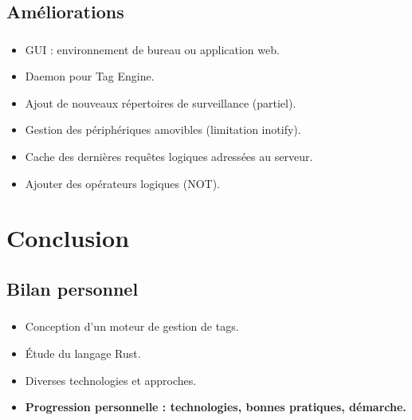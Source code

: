 \documentclass[10pt]{beamer}
\begin{document}
\subsection{Améliorations}
\begin{frame}
    \frametitle{\subsecname}
    \begin{itemize}
        \pause
        \item GUI : environnement de bureau ou application web.
        \pause
        \item Daemon pour Tag Engine.
        \pause
        \item Ajout de nouveaux répertoires de surveillance (partiel).
        \pause
        \item Gestion des périphériques amovibles (limitation inotify).
        \pause
        \item Cache des dernières requêtes logiques adressées au serveur.
        \pause
        \item Ajouter des opérateurs logiques (NOT).
    \end{itemize}
\end{frame}

\section{Conclusion}
\subsection{Bilan personnel}
\begin{frame}
    \frametitle{\subsecname}
    \begin{itemize}
        \pause
        \item Conception d'un moteur de gestion de tags.
        \pause
        \item Étude du langage Rust.
        \pause
        \item Diverses technologies et approches.
        \pause
        \item \textbf{Progression personnelle : technologies, bonnes pratiques, démarche.}
    \end{itemize}
\end{frame}

\end{document}
